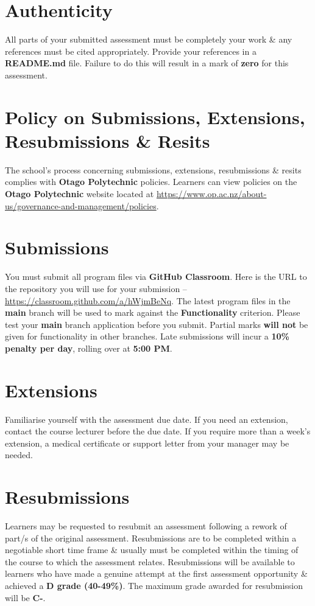 \documentclass{article}
\begin{document}
\section*{Authenticity}
All parts of your submitted assessment must be completely your work \& any references must be cited appropriately. Provide your references in a \textbf{README.md} file. Failure to do this will result in a mark of \textbf{zero} for this assessment.

\section*{Policy on Submissions, Extensions, Resubmissions \& Resits}
The school's process concerning submissions, extensions, resubmissions \& resits complies with \textbf{Otago Polytechnic} policies. Learners can view policies on the \textbf{Otago Polytechnic} website located at \href{https://www.op.ac.nz/about-us/governance-and-management/policies}{https://www.op.ac.nz/about-us/governance-and-management/policies}.

\section*{Submissions}
You must submit all program files via \textbf{GitHub Classroom}. Here is the URL to the repository you will use for your submission – \href{https://classroom.github.com/a/hWjmBeNq}{https://classroom.github.com/a/hWjmBeNq}. The latest program files in the \textbf{main} branch will be used to mark against the \textbf{Functionality} criterion. Please test your \textbf{main} branch application before you submit. Partial marks \textbf{will not} be given for functionality in other branches. Late submissions will incur a \textbf{10\% penalty per day}, rolling over at \textbf{5:00 PM}.

\section*{Extensions}
Familiarise yourself with the assessment due date. If you need an extension, contact the course lecturer before the due date. If you require more than a week's extension, a medical certificate or support letter from your manager may be needed.

\section*{Resubmissions}
Learners may be requested to resubmit an assessment following a rework of part/s of the original assessment. Resubmissions are to be completed within a negotiable short time frame \& usually must be completed within the timing of the course to which the assessment relates. Resubmissions will be available to learners who have made a genuine attempt at the first assessment opportunity \& achieved a \textbf{D grade (40-49\%)}. The maximum grade awarded for resubmission will be \textbf{C-}.
\end{document}

